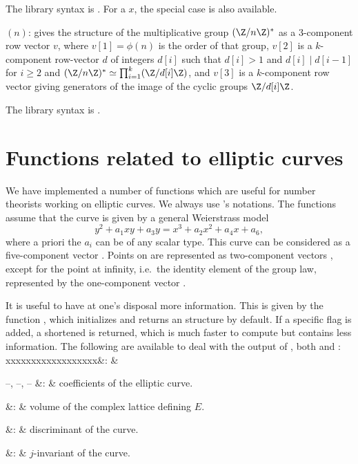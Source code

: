 The library syntax is .
For a  $x$, the special case
 is also available.

$(n)$: \label{se:znstar}gives the structure of the multiplicative group
$(\Z/n\Z)^*$ as a 3-component row vector $v$, where $v[1]=\phi(n)$ is the
order of that group, $v[2]$ is a $k$-component row-vector $d$ of integers
$d[i]$ such that $d[i]>1$ and $d[i]\mid d[i-1]$ for $i \ge 2$ and
$(\Z/n\Z)^* \simeq \prod_{i=1}^k(\Z/d[i]\Z)$, and $v[3]$ is a $k$-component row
vector giving generators of the image of the cyclic groups $\Z/d[i]\Z$.

The library syntax is .

\section{Functions related to elliptic curves}

We have implemented a number of functions which are useful for number
theorists working on elliptic curves. We always use 's notations.
The functions assume that the curve is given by a general Weierstrass
model
$$
  y^2+a_1xy+a_3y=x^3+a_2x^2+a_4x+a_6,
$$
where a priori the $a_i$ can be of any scalar type. This curve can be
considered as a five-component vector . Points on
 are represented as two-component vectors \kbd{[x,y]}, except for the
point at infinity, i.e.~the identity element of the group law, represented by
the one-component vector \kbd{[0]}.

  It is useful to have at one's disposal more information. This is given by
the function , which initializes and returns an
 structure by default. If a specific flag is added, a
shortened  is returned, which is much
faster to compute but contains less information. The following  are available to deal with the output of ,
both  and :
\settabs\+xxxxxxxxxxxxxxxxxx&: &\cr

\+ --, --, -- &: &
coefficients of the elliptic curve.\cr

\+  &: &  volume of the complex lattice defining $E$.\cr

\+  &: & discriminant of the curve.\cr

\+     &: & $j$-invariant of the curve.\cr


